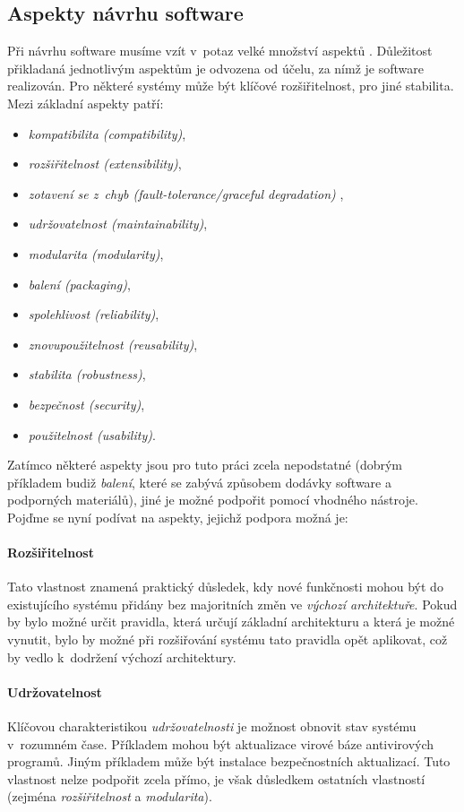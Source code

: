 \subsection{Aspekty návrhu software}
\label{analysis-sw_design_aspects}
Při návrhu software musíme vzít v~potaz velké množství aspektů \cite{wiki:software_design}. Důležitost přikladaná jednotlivým aspektům je odvozena od účelu, za nímž je software realizován. Pro některé systémy může být klíčové rozšiřitelnost, pro jiné stabilita. Mezi základní aspekty patří:

\begin{itemize}
\item \emph{kompatibilita (compatibility)},
\item \emph{rozšiřitelnost (extensibility)},
\item \emph{zotavení se z~chyb (fault-tolerance/graceful degradation)} \cite{wiki:fault-tolerance},
\item \emph{udržovatelnost (maintainability)},
\item \emph{modularita (modularity)},
\item \emph{balení (packaging)},
\item \emph{spolehlivost (reliability)},
\item \emph{znovupoužitelnost (reusability)},
\item \emph{stabilita (robustness)},
\item \emph{bezpečnost (security)},
\item \emph{použitelnost (usability)}.
\end{itemize}

Zatímco některé aspekty jsou pro tuto práci zcela nepodstatné (dobrým příkladem budiž \emph{balení}, které se zabývá způsobem dodávky software a podporných materiálů), jiné je možné podpořit pomocí vhodného nástroje. Pojďme se nyní podívat na aspekty, jejichž podpora možná je:

\paragraph{Rozšiřitelnost} Tato vlastnost znamená praktický důsledek, kdy nové funkčnosti mohou být do existujícího systému přidány bez majoritních změn ve \emph{výchozí architektuře}. Pokud by bylo možné určit pravidla, která určují základní architekturu a která je možné vynutit, bylo by možné při rozšiřování systému tato pravidla opět aplikovat, což by vedlo k~dodržení výchozí architektury.

\paragraph{Udržovatelnost} Klíčovou charakteristikou \emph{udržovatelnosti} je možnost obnovit stav systému v~rozumném čase. Příkladem mohou být aktualizace virové báze antivirových programů. Jiným příkladem může být instalace bezpečnostních aktualizací. Tuto vlastnost nelze podpořit zcela přímo, je však důsledkem ostatních vlastností (zejména \emph{rozšiřitelnost} a \emph{modularita}).

